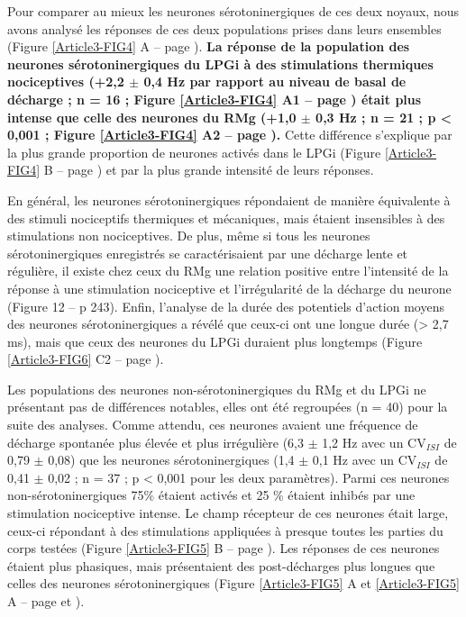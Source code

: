 \documentclass[a4paper,12pt,twoside]{report}
\begin{document}
Pour comparer au mieux les neurones sérotoninergiques de ces deux noyaux, nous avons analysé les réponses de ces deux populations prises dans leurs ensembles (Figure \ref{Article3-FIG4} A – page \pageref{Article3-FIG4}). \textbf{La réponse de la population des neurones sérotoninergiques du LPGi à des stimulations thermiques nociceptives (+2,2 $\pm$ 0,4 Hz par rapport au niveau de basal de décharge ; n = 16 ; Figure \ref{Article3-FIG4} A1 – page \pageref{Article3-FIG4}) était plus intense que celle des neurones du RMg (+1,0 $\pm$ 0,3 Hz ; n = 21 ; p < 0,001 ; Figure \ref{Article3-FIG4} A2 – page \pageref{Article3-FIG4}).} Cette différence s’explique par la plus grande proportion de neurones activés dans le LPGi (Figure \ref{Article3-FIG4} B – page \pageref{Article3-FIG4}) et par la plus grande intensité de leurs réponses. 

En général, les neurones sérotoninergiques répondaient de manière équivalente à des stimuli nociceptifs thermiques et mécaniques, mais étaient insensibles à des stimulations non nociceptives. De plus, même si tous les neurones sérotoninergiques enregistrés se caractérisaient par une décharge lente et régulière, il existe chez ceux du RMg une relation positive entre l’intensité de la réponse à une stimulation nociceptive et l’irrégularité de la décharge du neurone (Figure 12 – p 243). Enfin, l’analyse de la durée des potentiels d’action moyens des neurones sérotoninergiques a révélé que ceux-ci ont une longue durée (> 2,7 ms), mais que ceux des neurones du LPGi duraient plus longtemps (Figure \ref{Article3-FIG6} C2 – page \pageref{Article3-FIG6}).

Les populations des neurones non-sérotoninergiques du RMg et du LPGi ne présentant pas de différences notables, elles ont été regroupées (n = 40) pour la suite des analyses. Comme attendu, ces neurones avaient une fréquence de décharge spontanée plus élevée et plus irrégulière (6,3 $\pm$ 1,2 Hz avec un CV$_{ISI}$ de 0,79 $\pm$ 0,08) que les neurones sérotoninergiques (1,4 $\pm$ 0,1 Hz avec un CV$_{ISI}$ de 0,41 $\pm$ 0,02 ; n = 37 ; p < 0,001 pour les deux paramètres). Parmi ces neurones non-sérotoninergiques 75\% étaient activés et 25 \% étaient inhibés par une stimulation nociceptive intense. Le champ récepteur de ces neurones était large, ceux-ci répondant à des stimulations appliquées à presque toutes les parties du corps testées (Figure \ref{Article3-FIG5} B – page \pageref{Article3-FIG5}). Les réponses de ces neurones étaient plus phasiques, mais présentaient des post-décharges plus longues que celles des neurones sérotoninergiques (Figure \ref{Article3-FIG5} A et \ref{Article3-FIG5} A – page \pageref{Article3-FIG5} et \pageref{Article3-FIG6}). 
\end{document}
